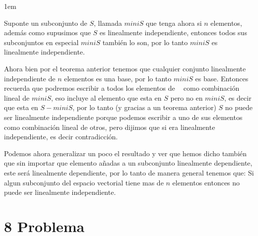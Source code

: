 \documentclass[12pt, fleqn]{article}                             %
\newenvironment{SmallIndentation}[1][0.75em]                    %
        {\begin{adjustwidth}{#1}{}\begin{footnotesize}}             %
        {\end{footnotesize}\end{adjustwidth}}                       %
\theoremstyle{break}                                            %
\DeclareMathOperator \GenericField {\mathbb{F}}                 %
\DeclareMathOperator \VectorSet    {\mathbb{V}}                 %
\DeclareMathOperator \VectorSpace  {\VectorSet_{\GenericField}} %
\begin{document}
\begin{itemize}
\begin{SmallIndentation}[1em]
                Suponte un subconjunto de $S$, llamada $miniS$ que tenga ahora si $n$ elementos, 
                además como supusimos que $S$ es linealmente independiente, entonces todos sus subconjuntos
                en especial $miniS$ también lo son, por lo tanto $miniS$ es linealmente independiente.

                Ahora bien por el teorema anterior tenemos que cualquier conjunto linealmente independiente
                de $n$ elementos es una base, por lo tanto $miniS$ es base.
                Entonces recuerda que podremos escribir a todos los elementos de $\VectorSpace$ como combinación
                lineal de $miniS$, eso incluye al elemento que esta en $S$ pero no en $miniS$, es decir que esta en
                $S - miniS$, por lo tanto (y gracias a un teorema anterior) $S$ no puede ser linealmente independiente
                porque podemos escribir a uno de sus elementos como combinación lineal de otros, pero dijimos que si era
                linealmente independiente, es decir contradicción.

                Podemos ahora generalizar un poco el resultado y ver que hemos dicho también que sin importar que elemento
                añadas a un subconjunto linealmente dependiente, este será linealmente dependiente, por lo tanto de manera
                general tenemos que:
                Si algun subconjunto del espacio vectorial tiene mas de $n$ elementos entonces no puede ser linealmente
                independiente.
            
            \end{SmallIndentation}

    \end{itemize}



\clearpage
\section{8 Problema}
    
\end{document}
